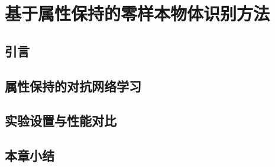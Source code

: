 \chapter{基于属性保持的零样本物体识别方法}

\section{引言}

\section{属性保持的对抗网络学习}

\section{实验设置与性能对比}

\section{本章小结}
